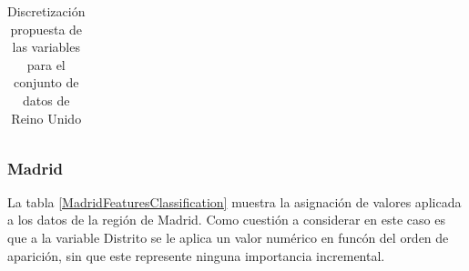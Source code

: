 \begin{table}[H]
\begin{center}
\begin{tabular}{|c|c|c|c|}
			\hline
			\hline
		\end{tabular}
	\end{center}
	\caption{Discretización propuesta de las variables para el conjunto de datos de Reino Unido}
	\label{UKFeaturesClassification}
\end{table}


\subsubsection*{Madrid}

La tabla \ref{MadridFeaturesClassification} muestra la asignación de valores aplicada a los datos de la región de Madrid. Como cuestión a considerar en este caso es que a la variable Distrito se le aplica un valor numérico en funcón del orden de aparición, sin que este represente ninguna importancia incremental.

